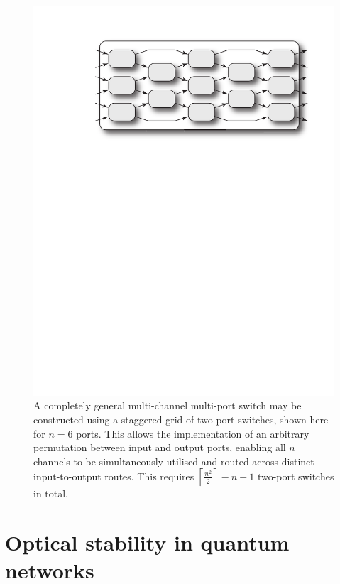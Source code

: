 \documentclass[aps,rmp,twocolumn,amsmath,amssymb,nofootinbib,superscriptaddress,longbibliography,floatfix,table-of-contents,eqsecnum]{revtex4-1}
\begin{document}
\begin{figure}[!htb]
\includegraphics[width=\columnwidth]{multi_channel_multi_port_switch}
\caption{A completely general multi-channel multi-port switch may be constructed using a staggered grid of two-port switches, shown here for \mbox{$n=6$} ports. This allows the implementation of an arbitrary permutation between input and output ports, enabling all $n$ channels to be simultaneously utilised and routed across distinct input-to-output routes. This requires \mbox{$\left\lceil \frac{n^2}{2}\right\rceil - n + 1$} two-port switches in total.} \label{fig:multi_channel_multi_port_switch} 	
\end{figure}

%
%

\section{Optical stability in quantum networks} 
\end{document}
